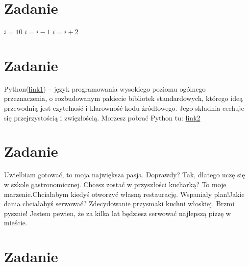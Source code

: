 \documentclass[a4paper,11pt]{article}
\begin{document}
\section{Zadanie}
\begin{algorithm}
$i = 10$\;
{$i = i-1$\;}{
{$i = i+2$\;}}
\end{algorithm}
\section{Zadanie}
Python(\href{https://www.google.com/search?channel=fs&client=ubuntu&q=python}{link1}) – język programowania wysokiego poziomu ogólnego przeznaczenia, o rozbudowanym pakiecie bibliotek standardowych, którego ideą przewodnią jest czytelność i klarowność kodu źródłowego. Jego składnia cechuje się przejrzystością i zwięzłością.
Morzesz pobrać Python tu: \href{https://www.python.org/}{link2}
\section{Zadanie}
\begin{dialogue}
   Uwielbiam gotować, to moja największa pasja.
 Doprawdy?
Tak, dlatego uczę się w szkole gastronomicznej.
 Chcesz zostać w przyszłości kucharką?
 To moje marzenie.Chciałabym kiedyś otworzyć własną restaurację.
 Wspaniały plan!Jakie dania chciałabyś serwować?
Zdecydowanie przysmaki kuchni włoskiej.
Brzmi pysznie! Jestem pewien, że za kilka lat będziesz serwować najlepszą pizzę w mieście.  
\end{dialogue}
\section{Zadanie}
 \blindtext 
{} 
\end{document}
